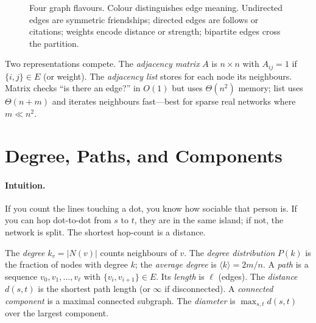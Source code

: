 \begin{figure}[h]
\caption{Four graph flavours. Colour distinguishes edge meaning. Undirected edges are symmetric friendships; directed edges are follows or citations; weights encode distance or strength; bipartite edges cross the partition.}
\label{fig:graph-types}
\end{figure}

Two representations compete. The \emph{adjacency matrix} $A$ is $n\times n$ with $A_{ij}=1$ if $\{i,j\}\in E$ (or weight). The \emph{adjacency list} stores for each node its neighbours. Matrix checks ``is there an edge?'' in $O(1)$ but uses $\Theta(n^2)$ memory; list uses $\Theta(n+m)$ and iterates neighbours fast---best for sparse real networks where $m\ll n^2$.

\section{Degree, Paths, and Components}
\label{sec:degree-paths}
\paragraph{Intuition.} If you count the lines touching a dot, you know how sociable that person is. If you can hop dot-to-dot from $s$ to $t$, they are in the same island; if not, the network is split. The shortest hop-count is a distance.

\begin{definition}\label{def:degree-path}
The \emph{degree} $k_v=|N(v)|$ counts neighbours of $v$. The \emph{degree distribution} $P(k)$ is the fraction of nodes with degree $k$; the \emph{average degree} is $\langle k\rangle=2m/n$. A \emph{path} is a sequence $v_0,v_1,\dots,v_\ell$ with $\{v_{i},v_{i+1}\}\in E$. Its \emph{length} is $\ell$ (edges). The \emph{distance} $d(s,t)$ is the shortest path length (or $\infty$ if disconnected). A \emph{connected component} is a maximal connected subgraph. The \emph{diameter} is $\max_{s,t}d(s,t)$ over the largest component.
\end{definition}

